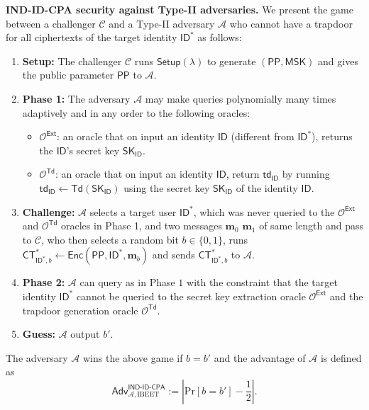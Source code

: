 \documentclass[runningheads]{llncs}
\def\cal{\mathcal}
\def\bf{\mathbf}
\def\SK{\mathsf{SK}}
\def\PP{\mathsf{PP}}
\def\MSK{\mathsf{MSK}}
\def\CT{\mathsf{CT}}
\def\td{\mathsf{td}}
\def\Setup{\mathsf{Setup}}
\def\Enc{\mathsf{Enc}}
\def\Ext{\mathsf{Ext}}
\def\Dec{\mathsf{Dec}}
\def\Td{\mathsf{Td}}
\def\Pr{\mathrm{Pr}}
\def\Adv{\mathsf{Adv}}
\def\IND{\textsf{IND-ID-CPA}}
\def\ID{\mathsf{ID}}
\begin{document}
	\noindent\textbf{IND-ID-CPA security against Type-II adversaries.} We present the game between a challenger $\cal{C}$ and a Type-II adversary $\cal{A}$ who cannot have a trapdoor for all ciphertexts of the target identity $\ID^*$ as follows:
	\begin{enumerate}
		\item \textbf{Setup:} The challenger $\cal{C}$ runs $\Setup(\lambda)$ to generate $(\PP,\MSK)$ and gives the public parameter $\PP$ to $\cal{A}$.
			\item \textbf{Phase 1:}  The adversary $\cal{A}$ may make queries polynomially many times adaptively and in any order to the following oracles:
		\begin{itemize}
			\item $\cal{O}^{\Ext}$: an oracle that on input an identity $\ID$ (different from $\ID^*$), returns the $\ID$'s secret key $\SK_{\ID}$.
			\item $\cal{O}^\Td$: an oracle that on input an identity $\ID$, return $\td_{\ID}$ by running $\td_{\ID}\gets\Td(\SK_{\ID})$ using the secret key $\SK_{\ID}$ of the identity $\ID$.
		\end{itemize}
		\item \textbf{Challenge:} $\cal{A}$ selects a target user $\ID^*$, which was never queried to the $\cal{O}^{\Ext}$ and  $\cal{O}^\Td$ oracles in Phase 1, and two messages $\bf{m}_0$ $\bf{m}_1$ of same length and pass to $\cal{C}$, who then selects a random bit $b\in\{0,1\}$, runs $\CT^*_{\ID^*, b}\gets\Enc(\PP,\ID^*,\bf{m}_b)$ and sends $\CT^*_{\ID^*,b}$ to $\cal{A}$.
		\item \textbf{Phase 2:} $\cal{A}$ can query as in Phase $1$ with the constraint that the target identity $\ID^*$ cannot be queried to the secret key extraction oracle $\cal{O}^{\Ext}$ and the trapdoor generation oracle $\cal{O}^\Td$.
		\item \textbf{Guess:} $\cal{A}$ output $b'$.
	\end{enumerate}
	The adversary $\cal{A}$ wins the above game if $b=b'$ and the advantage of $\cal{A}$ is defined as
	$$\Adv_{\cal{A},\text{IBEET}}^{\IND}:=\left|\Pr[b=b']-\frac{1}{2}\right|.$$
\end{document}
